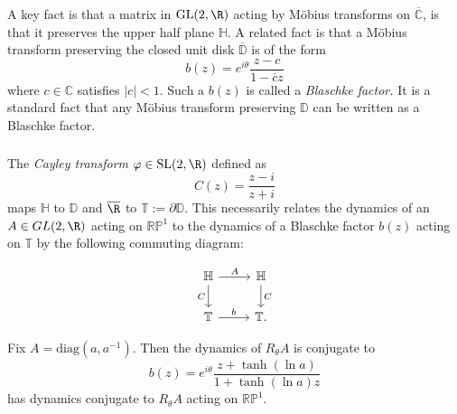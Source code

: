 \documentclass[10pt]{amsart}
\numberwithin{equation}{section}     %
\newcommand{\C}{\mathbb{C}}
\newcommand{\T}{\mathbb{T}}
\renewcommand{\H}{\mathbb{H}}
\newcommand{\D}{\mathbb{D}}
\newcommand{\RP}{\mathbb{RP}}
\newcommand{\SL}{\mathrm{SL}}
\newcommand{\GL}{\mathrm{GL}}
\begin{document}
\subsubsection{} A key fact is that a matrix in $\GL(2,\R)$ acting by Möbius transforms on $\overline{\C}$, is that it preserves the upper half plane $\H$. A related fact is that a Möbius transform preserving the closed unit disk $\overline{\mathbb{D}}$ is of the form \begin{equation}
    b(z) = e^{i\theta} \frac{z - c}{1 - \overline{c}z}
\end{equation} 
where $c \in \C$ satisfies $|c| < 1.$ Such a $b(z)$ is called a \emph{Blaschke factor.} It is a standard fact that any Möbius transform preserving $\D$ can be written as a Blaschke factor. \

\subsubsection{} The \emph{Cayley transform} $\varphi \in \SL(2,\R)$ defined as $$C(z) = \frac{z - i}{z + i}$$ maps $\H$ to $\mathbb{D}$ and $\overline{\R}$ to $\T := \partial \D$. This necessarily relates the dynamics of an $A \in GL(2,\R)$ acting on $\RP^1$ to the dynamics of a Blaschke factor $b(z)$ acting on $\T$ by the following commuting diagram: 


\[ \begin{tikzcd}
\H \arrow{r}{A} \arrow[swap]{d}{C} & \H \arrow{d}{C} \\%
\T \arrow{r}{b}& \T.
\end{tikzcd} 
\]

\begin{lemma} \label{equivalence}
    Fix $A = \mathrm{diag}(a,a^{-1})$.
   Then the dynamics of $R_\theta A$ is conjugate to $$b(z) = e^{i \theta} \frac{z + \tanh(\ln a)}{1 + \tanh(\ln a) z}$$ has dynamics conjugate to $R_\theta A$ acting on $\RP^1$.
\end{lemma}
\end{document}

